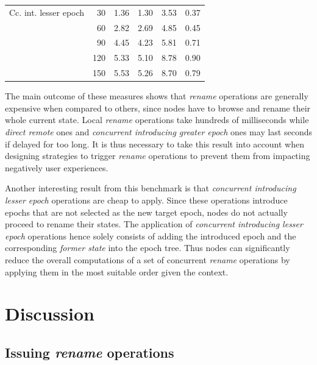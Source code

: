 \documentclass[10pt,journal,compsoc]{IEEEtran}
\begin{document}
\begin{table}[!ht]
{\begin{tabular}{lrrrrr}
            \cmidrule(lr){1-6}
            Cc. int. lesser epoch & 30  &     1.36 &     1.30 &       3.53 &   0.37 \\
                                    & 60  &     2.82 &     2.69 &       4.85 &   0.45 \\
                                    & 90  &     4.45 &     4.23 &       5.81 &   0.71 \\
                                    & 120 &     5.33 &     5.10 &       8.78 &   0.90 \\
                                    & 150 &     5.53 &     5.26 &       8.70 &   0.79 \\
            \bottomrule
        \end{tabular}
    }
\end{table}

The main outcome of these measures shows that \emph{rename} operations are generally expensive when compared to others, since nodes have to browse and rename their whole current state.
Local \emph{rename} operations take hundreds of milliseconds while \emph{direct remote} ones and \emph{concurrent introducing greater epoch} ones may last seconds if delayed for too long.
It is thus necessary to take this result into account when designing strategies to trigger \emph{rename} operations to prevent them from impacting negatively user experiences.

Another interesting result from this benchmark is that \emph{concurrent introducing lesser epoch} operations are cheap to apply.
Since these operations introduce epochs that are not selected as the new target epoch, nodes do not actually proceed to rename their states.
The application of \emph{concurrent introducing lesser epoch} operations hence solely consists of adding the introduced epoch and the corresponding \emph{former state} into the epoch tree.
Thus nodes can significantly reduce the overall computations of a set of concurrent \emph{rename} operations by applying them in the most suitable order given the context.

\section{Discussion}

\label{sec:discussion}

\subsection{Issuing \emph{rename} operations}
\label{sec:issuing-rename-operations}
\end{document}
